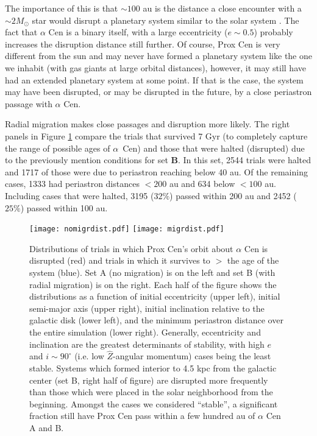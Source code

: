 \documentclass[preprint,12pt]{aastex}
\def\acen{{$\alpha$~Cen}}
\begin{document}
The importance of this is that $\sim 100$ au is the distance a close encounter with a 
$\sim 2 M_{\odot}$ star would disrupt a planetary system similar to the solar system
\citep{Kaib13}. The fact that $\alpha$ Cen is a binary itself, with a large eccentricity 
($e \sim 0.5$) probably increases the disruption distance still further.
Of course, Prox Cen is very different from the sun and may never 
have formed a planetary system like the one we inhabit (with gas giants at large 
orbital distances), however, it may still have had an extended planetary system
at some point. If that is the case, the system may have been disrupted, or may be
disrupted in the future, by a close periastron passage with $\alpha$ Cen.

Radial migration makes close passages and disruption more likely. The right 
panels in Figure \ref{fig:galacdist} compare the trials that survived 7 Gyr (to completely 
capture the range of possible ages of \acen)
and those that were halted (disrupted) due to the previously mention conditions 
for set \textbf{B}. In this set, 2544 trials were halted and 1717 of those were 
due to periastron reaching below 40 au. Of the remaining cases, 1333 had 
periastron distances $< 200$ au and 634 below $<100$ au. Including
cases that were halted, 3195 ($32\%$) passed within 200 au and 2452 ($25\%$) 
passed within 100 au.

\begin{figure}
\texttt{[image: nomigrdist.pdf]}
\texttt{[image: migrdist.pdf]}
\caption{Distributions of trials in which Prox Cen's orbit about $\alpha$ Cen
  is disrupted (red) and trials in which it survives to $>$ the age of the 
  system (blue). Set A (no migration) is on the left and set B (with 
  radial migration) is on the right. Each half of the figure shows the 
  distributions as a function of initial eccentricity (upper left), initial 
  semi-major axis (upper right), initial inclination relative to the galactic 
  disk (lower left), and the minimum periastron distance over the entire 
  simulation (lower right). Generally, eccentricity and inclination are the 
  greatest determinants of stability, with high $e$ and $i \sim 90^{\circ}$ 
  (i.e. low $\hat{Z}$-angular momentum) cases being the least stable. 
  Systems which formed interior to 4.5 kpc from the galactic center 
  (set B, right half of figure) are disrupted more frequently than 
  those which were placed in the solar neighborhood from the beginning. 
  Amongst the cases we considered ``stable'', a significant fraction still 
  have Prox Cen pass within a few hundred au of $\alpha$ Cen A and B.}
\label{fig:galacdist}
\end{figure}
\end{document}
